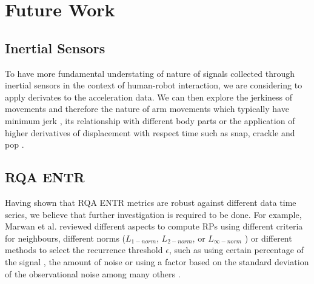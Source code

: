 \documentclass[fleqn,10pt]{wlscirep}
\begin{document}


%


%
%



\section*{Future Work}

\subsection*{Inertial Sensors}
To have more fundamental understating of nature of signals collected through 
inertial sensors in the context of human-robot interaction, we are considering 
to apply derivates to the acceleration data. We can then explore the jerkiness 
of movements and therefore the nature of arm movements which typically have 
minimum jerk \cite{flash1985}, its relationship with different body 
parts \cite{devries1982, mori2012} or the application of higher derivatives 
of displacement with respect time such as snap, crackle and pop \cite{eager2016}.

\subsection*{RQA ENTR}
Having shown that RQA ENTR metrics are robust against different data
time series, we believe that further investigation is required to be done. 
For example, Marwan et al. \cite{marwan2007, marwan2015} reviewed 
different aspects to compute RPs using different criteria for neighbours, 
different norms ($L_{1-norm}$, $L_{2-norm}$, or $L_{\infty-norm}$ ) or 
different methods to select the recurrence threshold $\epsilon$, 
such as using certain percentage of the signal \cite{letellier2006}, 
the amount of noise or using a factor based on the standard deviation 
of the observational noise among many others \cite{marwan2007}.
\end{document}
